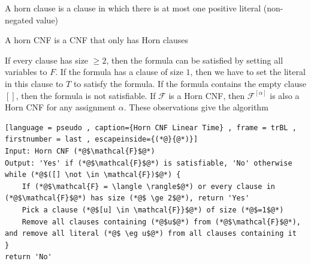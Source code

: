 \documentclass[a4paper]{article}
\theoremstyle{plain}
\theoremstyle{definition}
\newtheorem{defn}{Definition}[section]
\theoremstyle{remark}
\begin{document}
\begin{tcolorbox}[colback=black!3!white,colframe=black!60!white,title=\begin{defn}Horn Clause \label{Horn Clause}\end{defn}]
A horn clause is a clause in which there is at most one positive literal (non-negated value)
\end{tcolorbox}
\begin{tcolorbox}[colback=black!3!white,colframe=black!60!white,title=\begin{defn}Horn CNF \label{Horn CNF}\end{defn}]
A horn CNF is a CNF that only has Horn clauses
\end{tcolorbox}
\begin{tcolorbox}[colback=black!3!white,colframe=black!60!white,title=\begin{defn}Satisfiability of Horn CNF \label{Satisfiability of Horn CNF}\end{defn}]
If every clause has size $\ge 2$, then the formula can be satisfied by setting all variables to $F$. If the formula has a clause of size $1$, then we have to set the literal in this clause to $T$ to satisfy the formula. If the formula contains the empty clause $[]$, then the formula is not satisfiable. If $\mathcal{F}$ is a Horn CNF, then $\mathcal{F}^{[\alpha]}$ is also a Horn CNF for any assignment $\alpha$. These observations give the algorithm
\begin{lstlisting}[language = pseudo , caption={Horn CNF Linear Time} , frame = trBL , firstnumber = last , escapeinside={(*@}{@*)}]
Input: Horn CNF (*@$\mathcal{F}$@*)
Output: 'Yes' if (*@$\mathcal{F}$@*) is satisfiable, 'No' otherwise
while (*@$([] \not \in \mathcal{F})$@*) {
	If (*@$\mathcal{F} = \langle \rangle$@*) or every clause in (*@$\mathcal{F}$@*) has size (*@$ \ge 2$@*), return 'Yes'
	Pick a clause (*@$[u] \in \mathcal{F}}$@*) of size (*@$=1$@*)
	Remove all clauses containing (*@$u$@*) from (*@$\mathcal{F}$@*), and remove all literal (*@$ \eg u$@*) from all clauses containing it
}
return 'No'
\end{lstlisting}
\end{tcolorbox}
\end{document}
